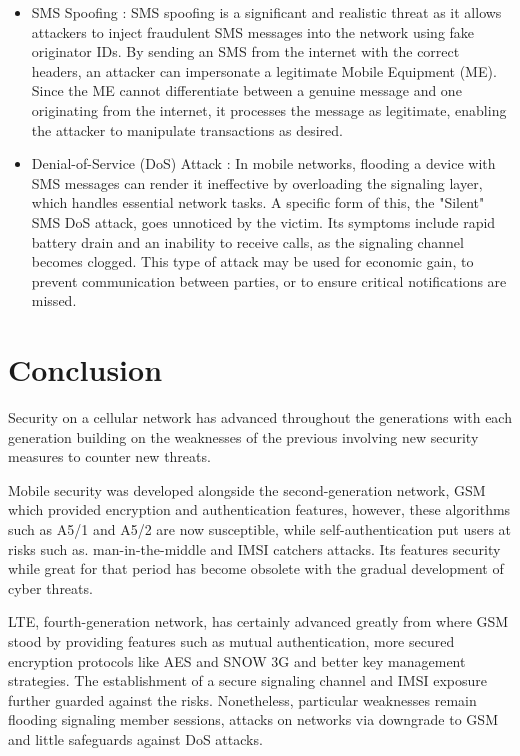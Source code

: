 \documentclass[conference]{IEEEtran}
\begin{document}
\begin{itemize}
\begin{itemize}
    \item SMS Spoofing : SMS spoofing is a significant and realistic threat as it allows attackers to inject fraudulent SMS messages into the network using fake originator IDs.
    By sending an SMS from the internet with the correct headers, an attacker can impersonate a legitimate Mobile Equipment (ME). Since the ME cannot differentiate between a genuine message and one originating from the internet, it processes the message as legitimate, enabling the attacker to manipulate transactions as desired.

    \item Denial-of-Service (DoS) Attack : In mobile networks, flooding a device with SMS messages can render it ineffective by overloading the signaling layer, which handles essential network tasks. 
    A specific form of this, the "Silent" SMS DoS attack, goes unnoticed by the victim. Its symptoms include rapid battery drain and an inability to receive calls, as the signaling channel becomes clogged. 
    This type of attack may be used for economic gain, to prevent communication between parties, or to ensure critical notifications are missed.
 
\end{itemize}
    
\end{itemize}




\section{Conclusion}
Security on a cellular network has advanced throughout the generations with each generation building on the weaknesses of the previous involving new security measures to counter new threats. 

Mobile security was developed alongside the second-generation network, GSM which provided encryption and authentication features, however, these algorithms such as A5/1 and A5/2 are now susceptible, while self-authentication put users at risks such as. man-in-the-middle and IMSI catchers attacks. Its features security while great for that period has become obsolete with the gradual development of cyber threats. \cite{kaur2012review}

LTE, fourth-generation network, has certainly advanced greatly from where GSM stood by providing features such as mutual authentication, more secured encryption protocols like AES and SNOW 3G and better key management strategies. The establishment of a secure signaling channel and IMSI exposure further guarded against the risks. Nonetheless, particular weaknesses remain flooding signaling member sessions, attacks on networks via downgrade to GSM and little safeguards against DoS attacks.
\end{document}
